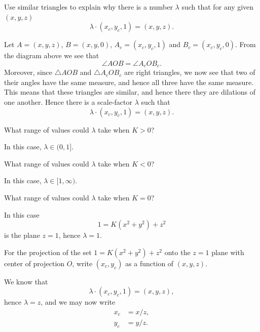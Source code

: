 \documentclass{ximera}
\begin{document}
\begin{problem}
  Use similar triangles to explain why there is a number $\lambda$
  such that for any given $(x,y,z)$
  \[
  \lambda\cdot(x_c,y_c,1) = (x,y,z).
  \]
  \begin{freeResponse}
    Let $A = (x,y,z)$, $B= (x,y,0)$, $A_c = (x_c,y_c,1)$ and
    $B_c=(x_c,y_c,0)$. From the diagram above we see that
    \[
    \angle AOB = \angle A_c O B_c.
    \]
    Moreover, since $\triangle AOB$ and $\triangle A_c O B_c$ are
    right triangles, we now see that two of their angles have the same
    measure, and hence all three have the same measure. This means
    that these triangles are similar, and hence there they are
    dilations of one another. Hence there is a scale-factor $\lambda$
    such that
    \[
    \lambda\cdot(x_c,y_c,1) = (x,y,z).
    \]
  \end{freeResponse}
\end{problem}


\begin{problem}
  What range of values could $\lambda$ take when $K>0$?
  \begin{freeResponse}
    In this case, $\lambda\in (0,1]$.
  \end{freeResponse}
\end{problem}

\begin{problem}
  What range of values could $\lambda$ take when $K<0$?
  \begin{freeResponse}
    In this case, $\lambda\in[1,\infty)$.
  \end{freeResponse}
\end{problem}

\begin{problem}
  What range of values could $\lambda$ take when $K=0$?
  \begin{freeResponse}
    In this case
    \[
    1=K\left(x^{2}+y^{2}\right)+z^{2} 
    \]
    is the plane $z = 1$, hence $\lambda=1$.
  \end{freeResponse}
\end{problem}



\begin{problem}
  For the projection of the set $1=K\left(x^{2}+y^{2}\right)+z^{2}$
  onto the $z=1$ plane with center of projection $O$, write
  $(x_{c},y_{c})$ as a function of $(x,y,z)$.
  \begin{freeResponse}
    We know that
    \[
    \lambda\cdot(x_{c},y_{c},1)=(x,y,z),
    \]
    hence $\lambda=z$, and we may now write
    \begin{align*}
      x_{c} &=x/z,\\
      y_{c} &=y/z.
    \end{align*}
  \end{freeResponse}
\end{problem}
\end{document}
